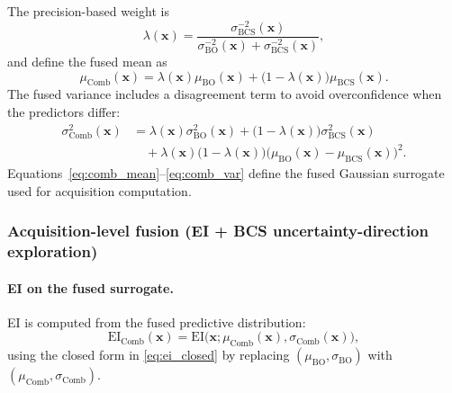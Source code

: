 \documentclass[lettersize,journal]{IEEEtran}
\begin{document}
The precision-based weight is
\begin{equation}
\label{eq:lambda}
\lambda(\mathbf{x})=
\frac{\sigma_{\mathrm{BCS}}^{-2}(\mathbf{x})}
{\sigma_{\mathrm{BO}}^{-2}(\mathbf{x})+\sigma_{\mathrm{BCS}}^{-2}(\mathbf{x})},
\end{equation}
and define the fused mean as
\begin{equation}
\label{eq:comb_mean}
\mu_{\mathrm{Comb}}(\mathbf{x})=
\lambda(\mathbf{x})\mu_{\mathrm{BO}}(\mathbf{x})
+\bigl(1-\lambda(\mathbf{x})\bigr)\mu_{\mathrm{BCS}}(\mathbf{x}).
\end{equation}
The fused variance includes a disagreement term to avoid overconfidence when the predictors differ:
\begin{equation}
\label{eq:comb_var}
\begin{aligned}
\sigma_{\mathrm{Comb}}^2(\mathbf{x})
&=\lambda(\mathbf{x})\sigma_{\mathrm{BO}}^2(\mathbf{x})
+\bigl(1-\lambda(\mathbf{x})\bigr)\sigma_{\mathrm{BCS}}^2(\mathbf{x})\\
&\quad+\lambda(\mathbf{x})\bigl(1-\lambda(\mathbf{x})\bigr)
\bigl(\mu_{\mathrm{BO}}(\mathbf{x})-\mu_{\mathrm{BCS}}(\mathbf{x})\bigr)^2.
\end{aligned}
\end{equation}
Equations~\eqref{eq:comb_mean}--\eqref{eq:comb_var} define the fused Gaussian surrogate used for acquisition computation.

\subsubsection{Acquisition-level fusion (EI + BCS uncertainty-direction exploration)}
\label{subsubsec:acq_fusion}

\paragraph{EI on the fused surrogate.}
EI is computed from the fused predictive distribution:
\begin{equation}
\label{eq:ei_comb}
\mathrm{EI}_{\mathrm{Comb}}(\mathbf{x})=
\mathrm{EI}\!\bigl(\mathbf{x};\mu_{\mathrm{Comb}}(\mathbf{x}),\sigma_{\mathrm{Comb}}(\mathbf{x})\bigr),
\end{equation}
using the closed form in \eqref{eq:ei_closed} by replacing $(\mu_{\mathrm{BO}},\sigma_{\mathrm{BO}})$ with $(\mu_{\mathrm{Comb}},\sigma_{\mathrm{Comb}})$.
\end{document}
